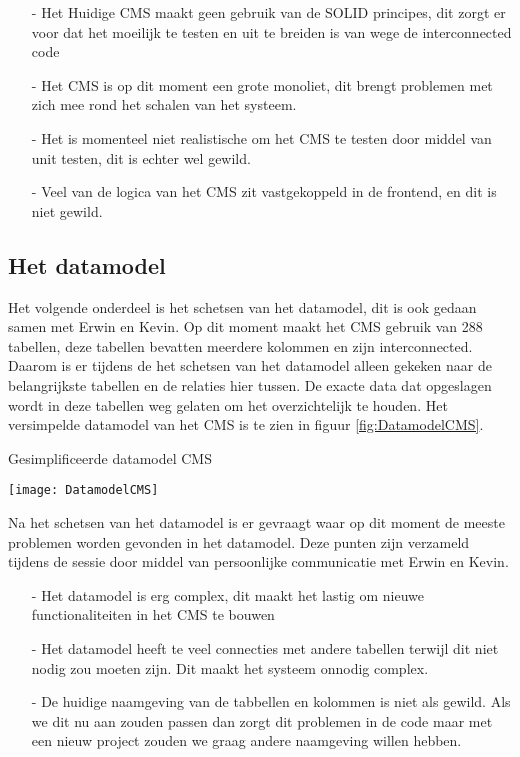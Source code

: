 {\begin{itemize}
	\item[-]{Het Huidige \gls{CMS} maakt geen gebruik van de SOLID principes, dit zorgt er voor dat het moeilijk te testen en uit te breiden is van wege de interconnected code}
	\item[-]{Het \gls{CMS} is op dit moment een grote monoliet, dit brengt problemen met zich mee rond het schalen van het systeem.}
	\item[-]{Het is momenteel niet realistische om het \gls{CMS} te testen door middel van unit testen, dit is echter wel gewild.}
    \item[-]{Veel van de logica van het CMS zit vastgekoppeld in de frontend, en dit is niet gewild.}
\end{itemize}

\newpage
\subsection{Het datamodel}
Het volgende onderdeel is het schetsen van het datamodel, dit is ook gedaan samen met Erwin en Kevin.
Op dit moment maakt het \gls{CMS} gebruik van 288 tabellen, deze tabellen bevatten meerdere kolommen en zijn interconnected.
Daarom is er tijdens de het schetsen van het datamodel alleen gekeken naar de belangrijkste tabellen en de relaties hier tussen.
De exacte data dat opgeslagen wordt in deze tabellen weg gelaten om het overzichtelijk te houden.
Het versimpelde datamodel van het CMS is te zien in figuur \ref{fig:DatamodelCMS}.

\begin{graphic}
	\captionsetup{type=figure}
	\caption{Gesimplificeerde datamodel CMS}
	\texttt{[image: DatamodelCMS]}
	\label{fig:DatamodelCMS}
\end{graphic}

\whitespace[2]
Na het schetsen van het datamodel is er gevraagt waar op dit moment de meeste problemen worden gevonden in het datamodel.
Deze punten zijn verzameld tijdens de sessie door middel van persoonlijke communicatie met Erwin en Kevin.
\begin{itemize}
    \item[-]{Het datamodel is erg complex, dit maakt het lastig om nieuwe functionaliteiten in het CMS te bouwen}
    \item[-]{Het datamodel heeft te veel connecties met andere tabellen terwijl dit niet nodig zou moeten zijn.
        Dit maakt het systeem onnodig complex.}
    \item[-]{De huidige naamgeving van de tabbellen en kolommen is niet als gewild.
        Als we dit nu aan zouden passen dan zorgt dit problemen in de code maar met een nieuw project zouden we graag andere naamgeving willen hebben.}
\end{itemize}

}
